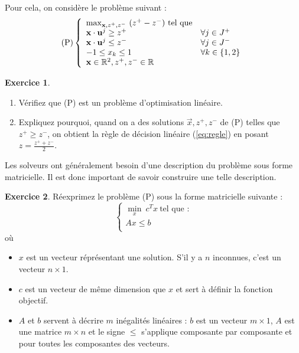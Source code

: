 \documentclass[a4paper,francais]{article}
\newcommand{\R}{{\ensuremath\mathbb{R}}}
\theoremstyle{definition}
\newtheorem{exercice}{Exercice}[section]
\begin{document}
Pour cela, on considère le problème suivant :
\[
\text{(P)}
\left\{
\begin{array}{ll}
  \max_{\vec{x},z^+,z^-} \ (z^+ - z^-) \ \text{tel que} & \\
  \vec{x} \cdot \vec{u}^j \geq z^+ & \forall j \in J^+ \\ 
  \vec{x} \cdot \vec{u}^j \leq z^- & \forall j \in J^- \\
  -1 \leq x_k \leq 1 & \forall k \in \{1, 2\} \\
  \vec{x} \in \R^2, z^+, z^- \in \R \\
\end{array}
\right.
\]

\begin{exercice}

  \begin{enumerate}
  \item Vérifiez que (P) est un problème d'optimisation linéaire.
  \item Expliquez pourquoi, quand on a des solutions $\vec{x}, z^+, z^-$
    de (P) telles que $z^+ \geq z^-$, on obtient la règle de décision
    linéaire (\ref{eq:regle}) en posant $z = \frac{z^+ + z^-}{2}$.  
  \end{enumerate}

\end{exercice}

Les solveurs ont généralement besoin d'une description du problème
sous forme matricielle. Il est donc important de savoir construire
une telle description.

\begin{exercice}
  Réexprimez le problème (P)
  sous la forme matricielle suivante :
  \[
  \left\{
  \begin{array}{c}
    \min_x \ c^T x \ \text{tel que :} \\
    Ax \leq b \\
  \end{array}
  \right. 
  \]
  où 
\begin{itemize}
\item $x$ est un vecteur réprésentant une solution. S'il y a $n$ inconnues, c'est un vecteur $n \times 1$.
\item $c$ est un vecteur de même dimension que $x$ et sert à définir la fonction objectif.
\item $A$ et $b$ servent à décrire $m$ inégalités linéaires : $b$ est un vecteur $m \times 1$,
  $A$ est une matrice $m \times n$ et le signe $\leq$ s'applique composante par composante et pour
  toutes les composantes des vecteurs.
\end{itemize}
\end{exercice}
\end{document}
